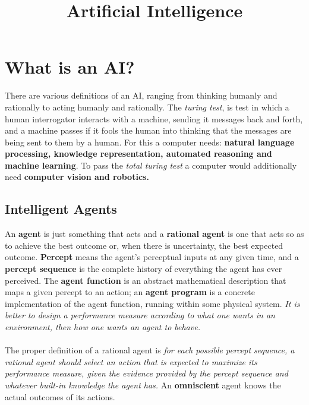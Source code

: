 \documentclass[twoside]{article}
\title{Artificial Intelligence}
\date{}
\author{}
\begin{document}
\maketitle
\section{What is an AI?}
There are various definitions of an AI, ranging from thinking humanly and
rationally to acting humanly and rationally. The \emph{turing test}, is test
in which a human interrogator interacts with a machine, sending it messages
back and forth, and a machine passes if it fools the human into thinking that
the messages are being sent to them by a human. For this a computer needs:
\textbf{natural language processing, knowledge representation, automated
reasoning and machine learning}. To pass the \emph{total turing test} a computer
would additionally need \textbf{computer vision and robotics.}
\subsection{Intelligent Agents}
An \textbf{agent} is just something that acts and a \textbf{rational agent} is
one that acts so as to achieve the best outcome or, when there is uncertainty,
the best expected outcome. \textbf{Percept} means the agent's perceptual inputs
at any given time, and a \textbf{percept sequence} is the complete history of
everything the agent has ever perceived. The \textbf{agent function} is an
abstract mathematical description that maps a given percept to an action; an
\textbf{agent program} is a concrete implementation of the agent function, running within some
physical system. \emph{It is better to design a performance measure according
to what one wants in an environment, then how one wants an agent to behave.}
\\ \\
The proper definition of a rational agent is \emph{for each possible percept
sequence, a rational agent should select an action that is expected to
maximize its performance measure, given the evidence provided by the percept
sequence and whatever built-in knowledge the agent has.} An \textbf{omniscient}
agent knows the actual outcomes of its actions.
\end{document}
